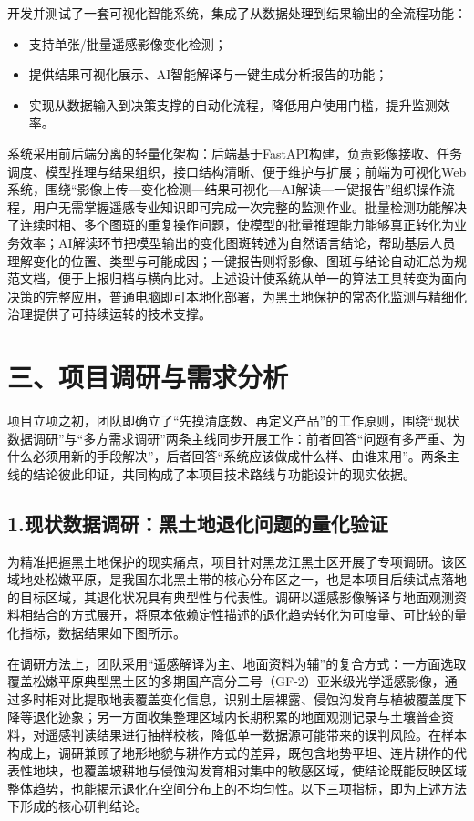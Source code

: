 \documentclass[12pt, a4paper]{ctexart}
\begin{document}
开发并测试了一套可视化智能系统，集成了从数据处理到结果输出的全流程功能：

\begin{itemize}
    \item 支持单张/批量遥感影像变化检测；
    \item 提供结果可视化展示、AI智能解译与一键生成分析报告的功能；
    \item 实现从数据输入到决策支撑的自动化流程，降低用户使用门槛，提升监测效率。
\end{itemize}

系统采用前后端分离的轻量化架构：后端基于FastAPI构建，负责影像接收、任务调度、模型推理与结果组织，接口结构清晰、便于维护与扩展；前端为可视化Web系统，围绕“影像上传—变化检测—结果可视化—AI解读—一键报告”组织操作流程，用户无需掌握遥感专业知识即可完成一次完整的监测作业。批量检测功能解决了连续时相、多个图斑的重复操作问题，使模型的批量推理能力能够真正转化为业务效率；AI解读环节把模型输出的变化图斑转述为自然语言结论，帮助基层人员理解变化的位置、类型与可能成因；一键报告则将影像、图斑与结论自动汇总为规范文档，便于上报归档与横向比对。上述设计使系统从单一的算法工具转变为面向决策的完整应用，普通电脑即可本地化部署，为黑土地保护的常态化监测与精细化治理提供了可持续运转的技术支撑。

\section{三、项目调研与需求分析}

项目立项之初，团队即确立了“先摸清底数、再定义产品”的工作原则，围绕“现状数据调研”与“多方需求调研”两条主线同步开展工作：前者回答“问题有多严重、为什么必须用新的手段解决”，后者回答“系统应该做成什么样、由谁来用”。两条主线的结论彼此印证，共同构成了本项目技术路线与功能设计的现实依据。

\subsection{1.现状数据调研：黑土地退化问题的量化验证}

为精准把握黑土地保护的现实痛点，项目针对黑龙江黑土区开展了专项调研。该区域地处松嫩平原，是我国东北黑土带的核心分布区之一，也是本项目后续试点落地的目标区域，其退化状况具有典型性与代表性。调研以遥感影像解译与地面观测资料相结合的方式展开，将原本依赖定性描述的退化趋势转化为可度量、可比较的量化指标，数据结果如下图所示。

在调研方法上，团队采用“遥感解译为主、地面资料为辅”的复合方式：一方面选取覆盖松嫩平原典型黑土区的多期国产高分二号（GF-2）亚米级光学遥感影像，通过多时相对比提取地表覆盖变化信息，识别土层裸露、侵蚀沟发育与植被覆盖度下降等退化迹象；另一方面收集整理区域内长期积累的地面观测记录与土壤普查资料，对遥感判读结果进行抽样校核，降低单一数据源可能带来的误判风险。在样本构成上，调研兼顾了地形地貌与耕作方式的差异，既包含地势平坦、连片耕作的代表性地块，也覆盖坡耕地与侵蚀沟发育相对集中的敏感区域，使结论既能反映区域整体趋势，也能揭示退化在空间分布上的不均匀性。以下三项指标，即为上述方法下形成的核心研判结论。
\end{document}
